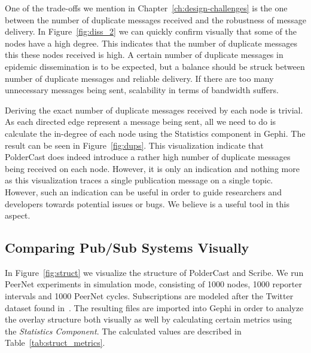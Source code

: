 One of the trade-offs we mention in Chapter~\ref{ch:design-challenges}
is the one between the number of duplicate messages received and the
robustness of message delivery. In Figure~\ref{fig:diss_2} we can
quickly confirm visually that some of the nodes have a high degree. This
indicates that the number of duplicate messages this these nodes
received is high. A certain number of duplicate messages in epidemic
dissemination is to be expected, but a balance should be struck between
number of duplicate messages and reliable delivery. If there are too
many unnecessary messages being sent, scalability in terms of bandwidth
suffers.

Deriving the exact number of duplicate messages received by each node is
trivial. As each directed edge represent  a message being sent, all we
need to do is calculate the in-degree of each node using the Statistics
component in Gephi. The result can be seen in Figure~\ref{fig:dups}.
This visualization indicate that PolderCast does indeed introduce a
rather high number of duplicate messages being received on each node.
However, it is only an indication and nothing more as this visualization
traces a single publication message on a single topic. However, such
an indication can be useful in order to guide researchers and developers
towards potential issues or bugs. We believe \demo is a useful tool in
this aspect.

\subsection{Comparing Pub/Sub Systems Visually}

In Figure~\ref{fig:struct} we visualize the structure of PolderCast and
Scribe. We run PeerNet experiments in simulation mode, consisting of
1000 nodes, 1000 reporter intervals and 1000 PeerNet cycles.
Subscriptions are modeled after the Twitter dataset found
in~\cite{Kwak10www}. The resulting \gexf{} files are imported into Gephi
in order to analyze the overlay structure both visually as well by
calculating certain metrics using the \emph{Statistics Component}. The
calculated values are described in Table~\ref{tab:struct_metrics}.

